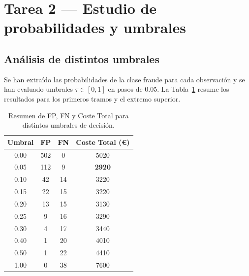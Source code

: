 \documentclass[../../__memoria.tex]{subfiles}
\begin{document}
\section[Tarea 2: Probabilidades y Umbrales]{Tarea 2 --- Estudio de probabilidades y umbrales}

\subsection{Análisis de distintos umbrales}
Se han extraído las probabilidades de la clase fraude para cada observación y se han evaluado umbrales $\tau \in [0, 1]$ en pasos de 0.05. La Tabla~\ref{tab:umbrales_coste} resume los resultados para los primeros tramos y el extremo superior.

\begin{table}[H]
  \centering
  \caption{Resumen de FP, FN y Coste Total para distintos umbrales de decisión.}
  \label{tab:umbrales_coste}
  \begin{tabular}{cccc}
    \toprule
    \textbf{Umbral} & \textbf{FP} & \textbf{FN} & \textbf{Coste Total (€)} \\
    \midrule
    0.00            & 502         & 0           & 5020                     \\
    0.05            & 112         & 9           & \textbf{2920}            \\
    0.10            & 42          & 14          & 3220                     \\
    0.15            & 22          & 15          & 3220                     \\
    0.20            & 13          & 15          & 3130                     \\
    0.25            & 9           & 16          & 3290                     \\
    0.30            & 4           & 17          & 3440                     \\
    0.40            & 1           & 20          & 4010                     \\
    0.50            & 1           & 22          & 4410                     \\
    1.00            & 0           & 38          & 7600                     \\
    \bottomrule
  \end{tabular}
\end{table}
\end{document}
